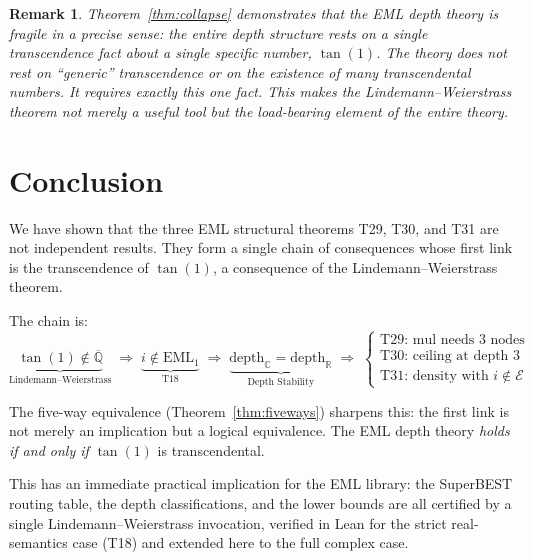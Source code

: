 \documentclass[11pt]{article}
\newtheorem{remark}{Remark}[section]
\begin{document}
\begin{remark}
Theorem~\ref{thm:collapse} demonstrates that the EML depth theory is fragile in
a precise sense: the entire depth structure rests on a single transcendence fact
about a single specific number, $\tan(1)$.  The theory does not rest on
``generic'' transcendence or on the existence of many transcendental numbers.
It requires exactly this one fact.  This makes the Lindemann--Weierstrass theorem
not merely a useful tool but the \emph{load-bearing element} of the entire theory.
\end{remark}

\section{Conclusion}

We have shown that the three EML structural theorems T29, T30, and T31 are not
independent results.  They form a single chain of consequences whose first link is
the transcendence of $\tan(1)$, a consequence of the Lindemann--Weierstrass theorem.

The chain is:
\[
  \underbrace{\tan(1) \notin \overline{\mathbb{Q}}}_{\text{Lindemann--Weierstrass}}
  \;\Longrightarrow\;
  \underbrace{i \notin \mathrm{EML}_1}_{\text{T18}}
  \;\Longrightarrow\;
  \underbrace{\mathrm{depth}_\mathbb{C} = \mathrm{depth}_\mathbb{R}}_{\text{Depth Stability}}
  \;\Longrightarrow\;
  \begin{cases}
    \text{T29: mul needs 3 nodes}\\
    \text{T30: ceiling at depth 3}\\
    \text{T31: density with } i \notin \mathcal{E}
  \end{cases}
\]

The five-way equivalence (Theorem~\ref{thm:fiveways}) sharpens this: the first link
is not merely an implication but a logical equivalence.  The EML depth theory
\emph{holds if and only if} $\tan(1)$ is transcendental.

This has an immediate practical implication for the EML library: the SuperBEST
routing table, the depth classifications, and the lower bounds are all certified
by a single Lindemann--Weierstrass invocation, verified in Lean for the strict
real-semantics case (T18) and extended here to the full complex case.
\end{document}
